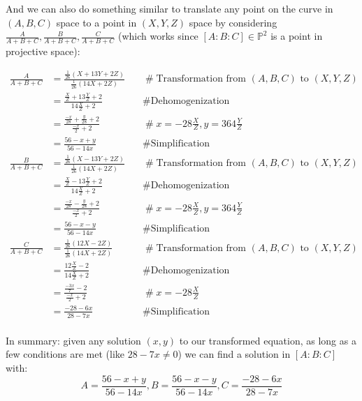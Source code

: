 \documentclass{article}
\begin{document}
And we can also do something similar to translate any point on the curve in $(A,B,C)$ space to a point in
$(X,Y,Z)$ space by considering $\frac{A}{A+B+C}, \frac{B}{A+B+C}, \frac{C}{A+B+C}$ (which works since
$[A:B:C] \in \mathbb{P}^2$ is a point in projective space):

\begin{equation*}
	\begin{array}{lllll}
		\frac{A}{A+B+C} &= \frac{\frac{1}{26}\left(X + 13Y + 2Z\right)} {\frac{1}{26}\left(14X+2Z\right)}
		& \quad \mathrel{\#} \text{Transformation from $(A,B,C)$ to $(X,Y,Z)$} \\
		 &= \frac{\frac{X}{Z} + 13\frac{Y}{Z} + 2}{14\frac{X}{Z}+2} & \quad \mathrel{\#} \text{Dehomogenization} \\
		 &= \frac{\frac{-x}{28} + \frac{y}{28} + 2}{\frac{-x}{2} + 2} & \quad \mathrel{\#} x=-28\frac{X}{Z}, y=364\frac{Y}{Z} \\
		 &= \frac{56 - x + y}{56 - 14x} & \quad \mathrel{\#} \text{Simplification} \\
		\frac{B}{A+B+C} &= \frac{\frac{1}{26}\left(X - 13Y + 2Z\right)} {\frac{1}{26}\left(14X+2Z\right)}
		& \quad \mathrel{\#} \text{Transformation from $(A,B,C)$ to $(X,Y,Z)$} \\
		 &= \frac{\frac{X}{Z} - 13\frac{Y}{Z} + 2}{14\frac{X}{Z}+2} & \quad \mathrel{\#} \text{Dehomogenization} \\
		 &= \frac{\frac{-x}{28} - \frac{y}{28} + 2}{\frac{-x}{2} + 2} & \quad \mathrel{\#} x=-28\frac{X}{Z}, y=364\frac{Y}{Z} \\
		 &= \frac{56 - x - y}{56 - 14x} & \quad \mathrel{\#} \text{Simplification} \\
		\frac{C}{A+B+C} &= \frac{\frac{1}{26}\left(12X - 2Z\right)} {\frac{1}{26}\left(14X+2Z\right)}
		& \quad \mathrel{\#} \text{Transformation from $(A,B,C)$ to $(X,Y,Z)$} \\
		 &= \frac{12\frac{X}{Z} - 2}{14\frac{X}{Z}+2} & \quad \mathrel{\#} \text{Dehomogenization} \\
		 &= \frac{\frac{-3x}{7} - 2}{\frac{-x}{2} + 2} & \quad \mathrel{\#} x=-28\frac{X}{Z} \\
		 &= \frac{-28 - 6x}{28 - 7x} & \quad \mathrel{\#} \text{Simplification} \\
	\end{array}
\end{equation*}


In summary: given any solution $(x,y)$ to our transformed equation, as long as a few conditions are met
(like $28-7x \neq 0$) we can find a solution in $[A:B:C]$ with:
\[ A = \frac{56 - x + y}{56 - 14x}, B = \frac{56 - x - y}{56 - 14x}, C = \frac{-28 - 6x}{28 - 7x} \]
\end{document}
